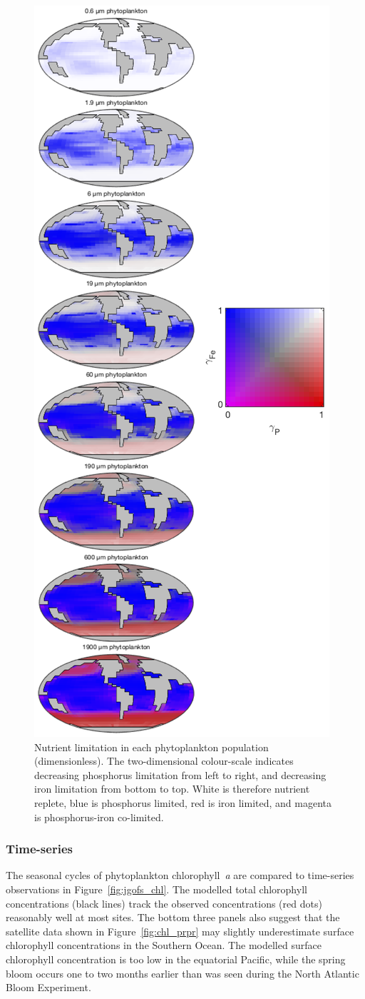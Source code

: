 \documentclass[gmd, manuscript]{copernicus}
\begin{document}
{\begin{figure}[htbp]
\includegraphics[width=0.55\linewidth]{Final_figures/Fig_16.png}
\caption{Nutrient limitation in each phytoplankton population (dimensionless). The two-dimensional colour-scale indicates decreasing phosphorus limitation from left to right, and decreasing iron limitation from bottom to top. White is therefore nutrient replete, blue is phosphorus limited, red is iron limited, and magenta is phosphorus-iron co-limited.}
\label{fig:surf_sizefrac_limitation}
\end{figure}

\clearpage
\subsubsection{Time-series}

The seasonal cycles of phytoplankton chlorophyll~\textit{a} are compared to time-series observations in Figure~\ref{fig:jgofs_chl}. The modelled total chlorophyll concentrations (black lines) track the observed concentrations (red dots) reasonably well at most sites. The bottom three panels also suggest that the satellite data shown in Figure~\ref{fig:chl_prpr} may slightly underestimate surface chlorophyll concentrations in the Southern Ocean. The modelled surface chlorophyll concentration is too low in the equatorial Pacific, while the spring bloom occurs one to two months earlier than was seen during the North Atlantic Bloom Experiment. 

}
\end{document}
